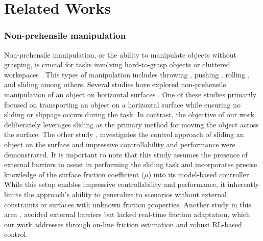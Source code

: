 \section{Related Works}
\subsubsection{\textbf{Non-prehensile manipulation}} Non-prehensile manipulation, or the ability to manipulate objects without grasping, is crucial for tasks involving hard-to-grasp objects or cluttered workspaces \cite{c7, c8}. This types of manipulation includes throwing \cite{c21}, pushing \cite{c20}, rolling \cite{c19}, and sliding \cite{c1} among others. Several studies have explored non-prehensile manipulation of an object on horizontal surfaces \cite{c1, c18, c9}. One of these studies \cite{c18} primarily focused on transporting an object on a horizontal surface while ensuring no sliding or slippage occurs during the task. In contrast, the objective of our work deliberately leverages sliding as the primary method for moving the object across the surface. The other study \cite{c1}, investigates the control approach of sliding an object on the surface and impressive controllability and performance were demonstrated. It is important to note that this study assumes the presence of external barriers to assist in performing the sliding task and incorporates precise knowledge of the surface friction coefficient (\textit{$\mu$}) into its model-based controller. While this setup enables impressive controllability and performance, it inherently limits the approach's ability to generalize to scenarios without external constraints or surfaces with unknown friction properties. Another study in this area \cite{c9}, avoided external barriers but lacked real-time friction adaptation, which our work addresses through on-line friction estimation and robust RL-based control.




